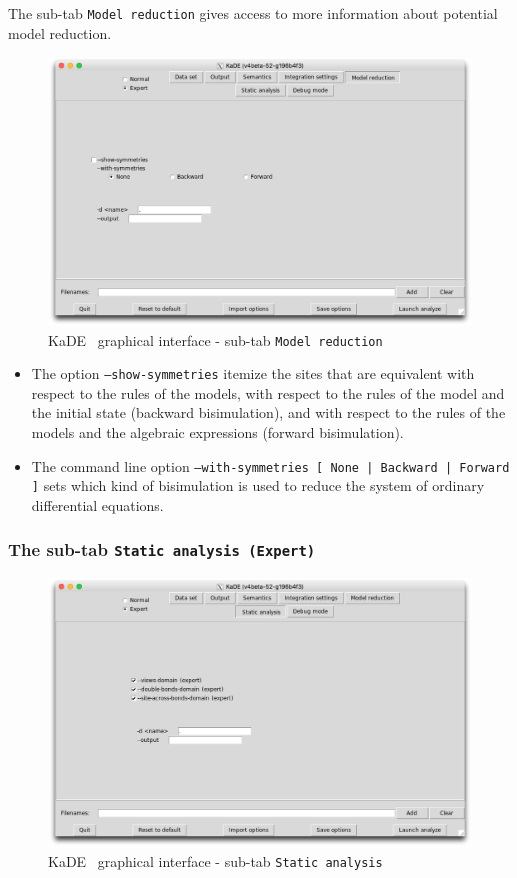 \documentclass[11pt]{book}
\def\KaDE{\textsf{KaDE}}
\begin{document}
The sub-tab \texttt{Model reduction} gives access to more information about
potential model reduction.
\begin{figure}[htbp]
\centering
\includegraphics[width=12cm,bb=0 0 1904 1208]{img/kade_4.png}
\caption{\KaDE~ graphical interface - sub-tab \texttt{Model reduction}}
\label{fig:kade:4}
\end{figure}

\begin{itemize}
  \item The option \texttt{--show-symmetries} itemize the sites that are equivalent with respect to the rules of the models, with respect to the rules of the model and the initial state (backward bisimulation), and with respect to the rules of the models and the algebraic expressions (forward bisimulation).
  \item The command line option \texttt{--with-symmetries [ None | Backward | Forward ]} sets which kind of bisimulation is used to reduce the system of ordinary differential equations.
\end{itemize}

\subsubsection{The sub-tab \texttt{Static analysis (Expert)}}

\begin{figure}[htbp]
\centering
\includegraphics[width=12cm,bb=0 0 1904 1208]{img/kade_5.png}
\caption{\KaDE~ graphical interface - sub-tab \texttt{Static analysis}}
\label{fig:kade:5}
\end{figure}
\end{document}
